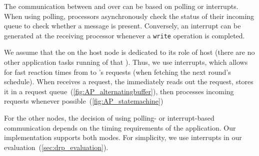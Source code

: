 The communication between \AP and \CP over \bolt can be based on polling or interrupts. When using polling, processors asynchronously check the status of their incoming \bolt queue to check whether a message is present. Conversely, an interrupt can be generated at the receiving processor whenever a \bolt \texttt{write} operation is completed.
\begin{description}

  \squarepar{%
    \item[\AP to \CP]
    When \AP writes to \bolt, we trigger an interrupt on the \CP and read out the message immediately.
    Since \DRP flow model is sporadic and new packets are expected infrequently~(\cref{sec:problem}), using interrupt is fast, energy efficient, and avoids building up the \bolt queue.%

    However, during LWB rounds, it is paramount that \CP operations are not delayed or disturbed. Thus, during the rounds, interrupts are disabled and (potential) new messages written by \AP are read out after the round.%
  }

  \item[\CP to \AP]
  We assume that the \AP on the host node is dedicated to its role of host (\ie there are no other application tasks running of that \AP).
  Thus, we use interrupts, which allows for fast reaction times from \AP to \CP's requests (\eg when fetching the next round's schedule).
  When \CP receives a \DRP request, the \AP immediately reads out the request, stores it in a request queue~(\cref{fig:AP_alternatingbuffer}), then processes incoming requests whenever possible~(\cref{fig:AP_statemachine})

  For the other nodes, the decision of using polling- or interrupt-based communication depends on the timing requirements of the application.
  Our implementation supports both modes.
  For simplicity, we use interrupts in our evaluation~(\cref{sec:drp_evaluation}).

\end{description}


